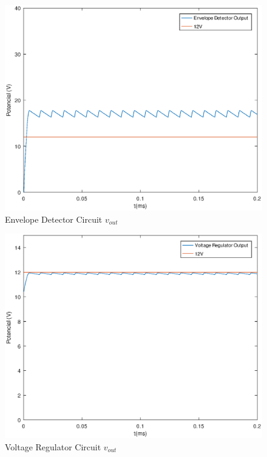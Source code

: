 \begin{figure}[ht]
	\centering
	\includegraphics[width=1\linewidth]{envelope_detector.eps}
	\caption{Envelope Detector Circuit $v_{out}$}
\label{fig:EV_vout_a}
\end{figure}

\begin{figure}[ht]
	\centering
	\includegraphics[width=1\linewidth]{voltage_regulator.eps}
	\caption{Voltage Regulator Circuit $v_{out}$}
\label{fig:VR_vout_a}
\end{figure}

